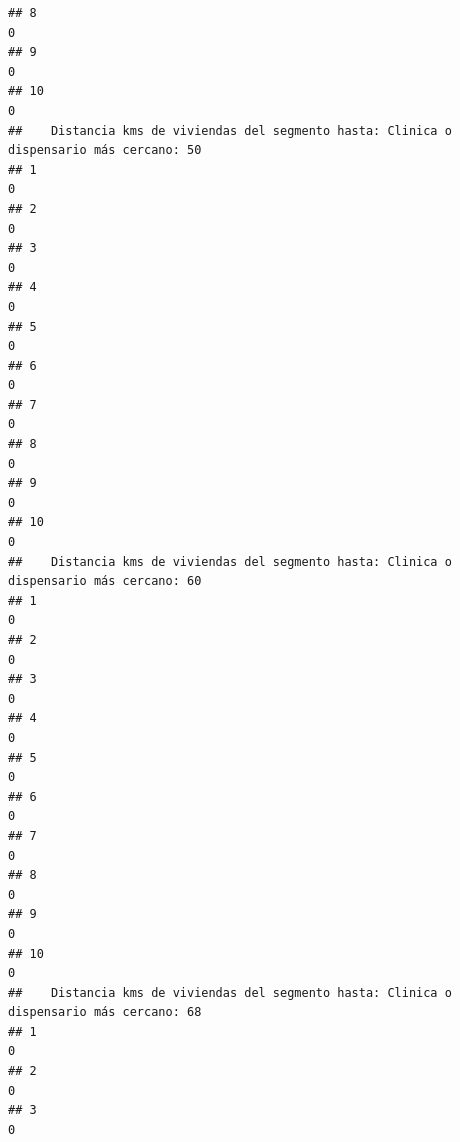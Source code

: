 \documentclass[11pt,]{article}
\begin{document}
\begin{verbatim}
## 8                                                                                     0
## 9                                                                                     0
## 10                                                                                    0
##    Distancia kms de viviendas del segmento hasta: Clinica o dispensario más cercano: 50
## 1                                                                                     0
## 2                                                                                     0
## 3                                                                                     0
## 4                                                                                     0
## 5                                                                                     0
## 6                                                                                     0
## 7                                                                                     0
## 8                                                                                     0
## 9                                                                                     0
## 10                                                                                    0
##    Distancia kms de viviendas del segmento hasta: Clinica o dispensario más cercano: 60
## 1                                                                                     0
## 2                                                                                     0
## 3                                                                                     0
## 4                                                                                     0
## 5                                                                                     0
## 6                                                                                     0
## 7                                                                                     0
## 8                                                                                     0
## 9                                                                                     0
## 10                                                                                    0
##    Distancia kms de viviendas del segmento hasta: Clinica o dispensario más cercano: 68
## 1                                                                                     0
## 2                                                                                     0
## 3                                                                                     0

\end{verbatim}
\end{document}

